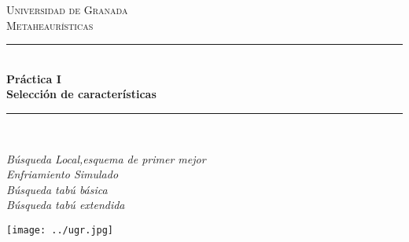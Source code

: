 \documentclass[a4paper,11pt]{article}
\begin{document}
\begin{titlepage}

\newcommand{\HRule}{\rule{\linewidth}{0.5mm}} %

\center %
 
\textsc{\LARGE Universidad de Granada}\\[1.5cm]
\textsc{\Large Metaheaurísticas}\\[0.5cm] 

\bigskip
\HRule \\[0.4cm]
{ \huge \bfseries Práctica I}\\[0.4cm] %
{ \huge \bfseries Selección de características}\\
\HRule \\[1.5cm]
 

\begin{minipage}{\textwidth}
\begin{center} \large
\emph{Búsqueda Local,esquema de primer mejor}\\
\emph{Enfriamiento Simulado}\\
\emph{Búsqueda tabú básica}\\
\emph{Búsqueda tabú extendida}\\
\end{center}
\end{minipage}


\begin{center}
\texttt{[image: ../ugr.jpg]}
\end{center}


\end{titlepage}
\end{document}
